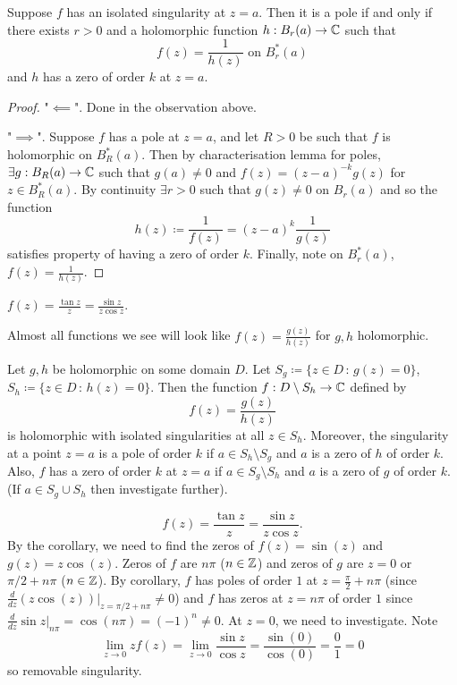 \documentclass[10pt, a4paper]{article}
\begin{document}
\begin{proposition}
    Suppose $f$ has an isolated singularity at $z = a$.
    Then it is a pole if and only if there exists $r > 0$ and a holomorphic function $h : B_r(a) \to \mathbb{C}$ such that
    \[
    f(z) = \frac{1}{h(z)}\text{ on } B_{r}^{*}(a)
    \]
    and $h$ has a zero of order $k$ at $z = a$.

    \begin{proof}
        "$\impliedby$".
        Done in the observation above.

        "$\implies$".
        Suppose $f$ has a pole at $z = a$,
        and let $R > 0$ be such that $f$ is holomorphic on $B_{R}^{*}(a)$.
        Then by characterisation lemma for poles,
        $\exists g : B_{R}(a) \to \mathbb{C}$ such that $g(a) \neq 0$ and $f(z) = (z - a) ^ {-k}g(z)$ for $z \in B_{R}^{*}(a)$.
        By continuity $\exists r > 0$ such that $g(z) \neq 0$ on $B_r(a)$ and so the function
        \[
        h(z) \coloneqq \frac{1}{f(z)} = (z - a) ^ k\frac{1}{g(z)}
        \]
        satisfies property of having a zero of order $k$.
        Finally,
        note on $B_{r}^{*}(a)$,
        $f(z) = \frac{1}{h(z)}$.
    \end{proof}
\end{proposition}

\begin{example}
    $f(z) = \frac{\tan{z}}{z} = \frac{\sin{z}}{z\cos{z}}$.
\end{example}

Almost all functions we see will look like $f(z) = \frac{g(z)}{h(z)}$ for $g, h$ holomorphic.

\begin{corollary}
    Let $g, h$ be holomorphic on some domain $D$.
    Let $S_g \coloneqq \{z \in D\,:\, g(z) = 0\}$,
    $S_h \coloneqq \{z \in D\,:\, h(z) = 0\}$.
    Then the function $f : D \setminus S_h \to \mathbb{C}$ defined by
    \[
    f(z) = \frac{g(z)}{h(z)}
    \]
    is holomorphic with isolated singularities at all $z \in S_h$.
    Moreover,
    the singularity at a point $z = a$ is a pole of order $k$ if $a \in S_h \setminus S_g$ and $a$ is a zero of $h$ of order $k$.
    Also,
    $f$ has a zero of order $k$ at $z = a$ if $a \in S_g \setminus S_h$ and $a$ is a zero of $g$ of order $k$.
    (If $a \in S_g \cup S_h$ then investigate further).
\end{corollary}

\begin{example}
    \[
    f(z) = \frac{\tan{z}}{z} = \frac{\sin{z}}{z\cos{z}}.
    \]
    By the corollary,
    we need to find the zeros of $f(z) = \sin(z)$ and $g(z) = z\cos(z)$.
    Zeros of $f$ are $n\pi$
    ($n \in \mathbb{Z}$)
    and zeros of $g$ are $z = 0$ or $\pi / 2 + n\pi$
    ($n \in \mathbb{Z}$).
    By corollary,
    $f$ has poles of order $1$ at $z = \frac{\pi}{2} + n\pi$
    (since $\frac{d}{dz}(z\cos(z))\big|_{z = \pi / 2 + n\pi} \neq 0$)
    and $f$ has zeros at $z = n\pi$ of order $1$ since $\frac{d}{dz}\sin{z}\big|_{n\pi} = \cos(n\pi) = (-1) ^ n \neq 0$.
    At $z = 0$,
    we need to investigate.
    Note
    \[
    \lim_{z \to 0}zf(z) = \lim_{z \to 0}\frac{\sin{z}}{\cos{z}} = \frac{\sin(0)}{\cos(0)} = \frac{0}{1} = 0
    \]
    so removable singularity.
\end{example}
\end{document}
